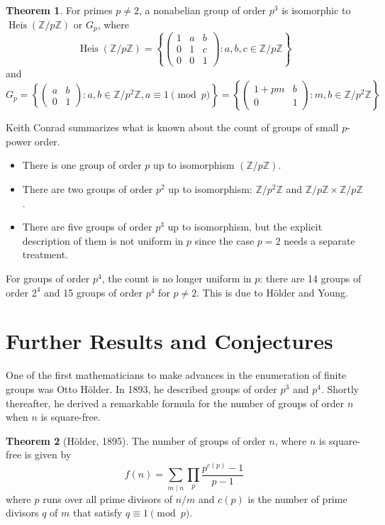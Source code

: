 \documentclass[12pt,reqno]{amsart}
\theoremstyle{plain}
\theoremstyle{definition}
\numberwithin{equation}{section}
\newtheorem{theorem}{Theorem}[section]
\begin{document}
\begin{theorem}
For primes $p\ne2$, a nonabelian group of order $p^3$ is isomorphic to $\operatorname{Heis}(\mathbb{Z}/p\mathbb{Z})$ or $G_p$, where
\[ \operatorname{Heis}(\mathbb{Z}/p\mathbb{Z})=\left\{\begin{pmatrix}1&a&b\\ 0&1&c\\ 0&0&1\end{pmatrix}:a,b,c\in\mathbb{Z}/p\mathbb{Z}\right\} \]
and
\[ G_p=\left\{\begin{pmatrix}a&b\\ 0&1\end{pmatrix}:a,b\in\mathbb{Z}/p^2\mathbb{Z},a\equiv1\pmod p\right\}=\left\{\begin{pmatrix}1+pm&b\\ 0&1\end{pmatrix}:m,b\in\mathbb{Z}/p^2\mathbb{Z}\right\} \]
\end{theorem}

Keith Conrad \cite{2} summarizes what is known about the count of groups of small $p$-power order.
\begin{itemize}[itemsep=5pt]
    \item There is one group of order $p$ up to isomorphism $(\mathbb{Z}/p\mathbb{Z})$.
    \item There are two groups of order $p^2$ up to isomorphism: $\mathbb{Z}/p^2\mathbb{Z}$ and $\mathbb{Z}/p\mathbb{Z}\times\mathbb{Z}/p\mathbb{Z}$.
    \item There are five groups of order $p^3$ up to isomorphism, but the explicit description of them is not uniform in $p$ since the case $p=2$ needs a separate treatment.
\end{itemize}
For groups of order $p^4$, the count is no longer uniform in $p$: there are 14 groups of order $2^4$ and 15 groups of order $p^4$ for $p\ne2$. This is due to H\"older and Young.


\section{Further Results and Conjectures}

One of the first mathematicians to make advances in the enumeration of finite groups was Otto H\"older. In 1893, he described groups of order $p^3$ and $p^4$. Shortly thereafter, he derived a remarkable formula for the number of groups of order $n$ when $n$ is square-free.

\begin{theorem}[H\"older, 1895]
The number of groups of order $n$, where $n$ is square-free is given by
\[ f(n)=\sum_{m \mid n}\prod_{p}\frac{p^{c(p)}-1}{p-1} \]
where $p$ runs over all prime divisors of $n/m$ and $c(p)$ is the number of prime divisors $q$ of $m$ that satisfy $q\equiv1\pmod p$.
\end{theorem}
\end{document}
